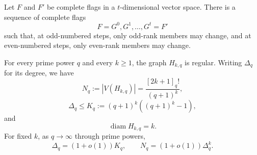 \documentclass[10pt,a4paper]{amsart}
\DeclareMathOperator{\diam}{diam}
\begin{document}
\begin{lemma}\label{lem:routing}
Let $F$ and $F'$ be complete flags in a $t$-dimensional vector space.  There is a sequence of complete flags
$$F=G^0,G^1,\ldots,G^t=F'$$
such that, at odd-numbered steps, only odd-rank members may change, and at even-numbered steps, only even-rank members may change.
\end{lemma}

\begin{proposition}\label{prop:H}
For every prime power $q$ and every $k\ge1$, the graph $H_{k,q}$ is regular. Writing $\Delta_q$ for its degree, we have
\begin{equation}\label{eq:H-order}
  N_q:=|V(H_{k,q})|=\frac{[2k+1]_q!}{(q+1)^k},
\end{equation}
\begin{equation}\label{eq:H-degree}
  \Delta_q\le K_q:=(q+1)^k\left((q+1)^k-1\right),
\end{equation}
and
\begin{equation}\label{eq:H-diameter}
  \diam H_{k,q}=k.
\end{equation}
For fixed $k$, as $q\to\infty$ through prime powers,
\begin{equation}\label{eq:H-asymptotic}
  \Delta_q=(1+o(1))K_q,
  \qquad
  N_q=(1+o(1))\Delta_q^k.
\end{equation}
\end{proposition}
\end{document}
